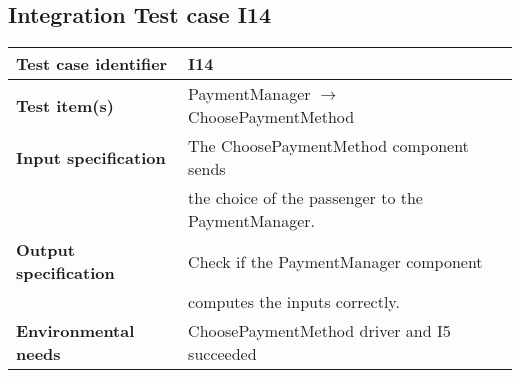 	\hypertarget{chapter 3.14}{ }
	\subsection{Integration Test case I14}
		\begin{adjustbox}{max width=\textwidth}
			\begin{tabular}{ l l}
				\hline 		\textbf{Test case identifier} & I14 \\
				\hline		\textbf{Test item(s)}  & PaymentManager $\rightarrow$ ChoosePaymentMethod \\
				\hline		\textbf{Input specification} & The ChoosePaymentMethod component sends \\& the choice of the passenger to the PaymentManager.\\
				\hline		\textbf{Output specification} & Check if the PaymentManager component\\ &  computes the inputs correctly.\\
				\hline		\textbf{Environmental needs} & ChoosePaymentMethod driver and I5 succeeded\\
				\hline
			\end{tabular}
		\end{adjustbox}